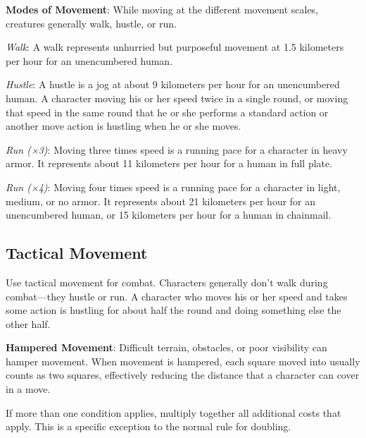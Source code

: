 \textbf{Modes of Movement}: While moving at the different movement scales, creatures generally walk, hustle, or run.

\textit{Walk}: A walk represents unhurried but purposeful movement at 1.5 kilometers per hour for an unencumbered human.

\textit{Hustle}: A hustle is a jog at about 9 kilometers per hour for an unencumbered human. A character moving his or her speed twice in a single round, or moving that speed in the same round that he or she performs a standard action or another move action is hustling when he or she moves.

\textit{Run (×3)}: Moving three times speed is a running pace for a character in heavy armor. It represents about 11 kilometers per hour for a human in full plate.

\textit{Run (×4)}: Moving four times speed is a running pace for a character in light, medium, or no armor. It represents about 21 kilometers per hour for an unencumbered human, or 15 kilometers per hour for a human in chainmail.

\subsection{Tactical Movement}
Use tactical movement for combat. Characters generally don't walk during combat---they hustle or run. A character who moves his or her speed and takes some action is hustling for about half the round and doing something else the other half.


\textbf{Hampered Movement}: Difficult terrain, obstacles, or poor visibility can hamper movement. When movement is hampered, each square moved into usually counts as two squares, effectively reducing the distance that a character can cover in a move.

If more than one condition applies, multiply together all additional costs that apply. This is a specific exception to the normal rule for doubling.


